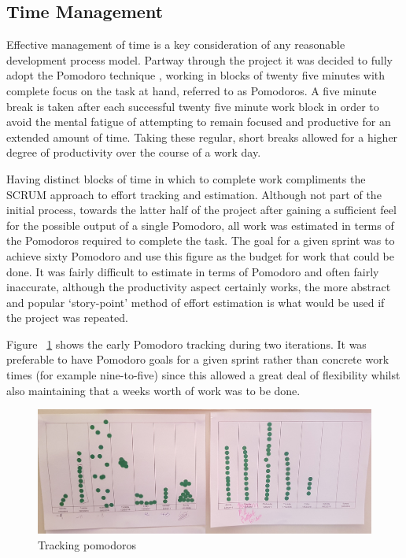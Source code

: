 \subsection{Time Management}
Effective management of time is a key consideration of any reasonable development process model. Partway through the project it was decided to fully adopt the Pomodoro technique \cite{pomodoro}, working in blocks of twenty five minutes with complete focus on the task at hand, referred to as Pomodoros. A five minute break is taken after each successful twenty five minute work block in order to avoid the mental fatigue of attempting to remain focused and productive for an extended amount of time. Taking these regular, short breaks allowed for a higher degree of productivity over the course of a work day.

Having distinct blocks of time in which to complete work compliments the SCRUM approach to effort tracking and estimation. Although not part of the initial process, towards the latter half of the project after gaining a sufficient feel for the possible output of a single Pomodoro, all work was estimated in terms of the Pomodoros required to complete the task. The goal for a given sprint was to achieve sixty Pomodoro and use this figure as the budget for work that could be done. It was fairly difficult to estimate in terms of Pomodoro and often fairly inaccurate, although the productivity aspect certainly works, the more abstract and popular `story-point' method of effort estimation is what would be used if the project was repeated.

Figure ~\ref{fig:pomo1} shows the early Pomodoro tracking during two iterations. It was preferable to have Pomodoro goals for a given sprint rather than concrete work times (for example nine-to-five) since this allowed a great deal of flexibility whilst also maintaining that a weeks worth of work was to be done.  

\begin{figure}[H]
    \centering
    \includegraphics[width=\textwidth]{images/process/pomotrack}
    \caption{Tracking pomodoros}
    \label{fig:pomo1}
\end{figure}




